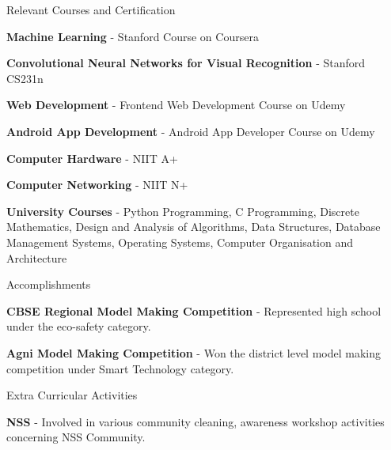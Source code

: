 \documentclass{resume} %
\begin{document}

\begin{rSection}{Relevant Courses and Certification}

\item{\textbf{Machine Learning}} - Stanford Course on Coursera 
\item{\textbf{Convolutional Neural Networks for Visual Recognition}} - Stanford CS231n
\item{\textbf{Web Development}} - Frontend Web Development Course on Udemy
\item{\textbf{Android App Development}} - Android App Developer Course on Udemy
\item{\textbf{Computer Hardware}} - NIIT A+
\item{\textbf{Computer Networking}} - NIIT N+
\item{\textbf{University Courses}} - Python Programming, C Programming, Discrete Mathematics, Design and Analysis of Algorithms, Data Structures, Database Management Systems, Operating Systems, Computer Organisation and Architecture

\end{rSection}

\begin{rSection}{Accomplishments}

\item{\textbf{CBSE Regional Model Making Competition}} - Represented high school under the eco-safety category.
\item{\textbf{Agni Model Making Competition}} - Won the district level model making competition under Smart Technology category. 



\end{rSection}

\begin{rSection}{Extra Curricular Activities}

\item{\textbf{NSS}} - Involved in various community cleaning, awareness workshop activities concerning NSS Community.

\end{rSection}
\end{document}
